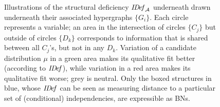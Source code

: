 \begin{figure}
	\addtocounter{figure}{-1} %
	\caption[Illustrations of the information deficiency ($\IDef_{\!\Ar})$ 
		for various hypergraphs $\Ar$]
	{
        Illustrations of the structural deficiency $\mathit{I\mskip-3.0muD\mskip-2.5mue\mskip-1.5muf}_{\mathcal A}$ underneath
          drawn underneath their
		  associated hypergraphs $\{ G_i\}$. Each circle represents a
		  variable; an area in the intersection of circles $\{C_j\}$
		  but outside of circles $\{D_k\}$ corresponds to information
		  that is shared between all $C_j$'s, but not in any
		  $D_k$. Variation of a candidate distribution $\mu$ in a
		  green area makes its qualitative fit better (according to
		  $\mathit{I\mskip-3.0muD\mskip-2.5mue\mskip-1.5muf}{}$), while variation in a red area makes its
		  qualitative fit worse; grey is neutral.
		  Only the boxed structures in blue,
		  whose $\mathit{I\mskip-3.0muD\mskip-2.5mue\mskip-1.5muf}$ can be seen as measuring distance to a particular set of (conditional) independencies, are expressible as BNs.}
	\label{fig:info-diagram}
	\end{figure}
% 
